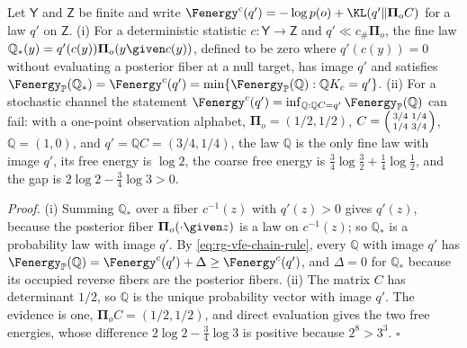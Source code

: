 \label{eq:rg-thermo-finite-unwarranted-infimum}
\label{eq:rg-thermo-finite-stochastic-infimum-witness}
Let $\mathsf Y$ and $\mathsf Z$ be finite and write
$\Fenergy^c(q')=-\log p(o)+\KL(q'\Vert\boldsymbol\Pi_oC)$ for a law $q'$ on $\mathsf Z$. (i) For a
deterministic statistic $c:\mathsf Y\to\mathsf Z$ and $q'\ll c_\#\boldsymbol\Pi_o$, the fine law
$\mathbb Q_*(y)=q'(c(y))\boldsymbol\Pi_o(y\given c(y))$, defined to be zero where $q'(c(y))=0$
without evaluating a posterior fiber at a null target, has image $q'$ and satisfies
$\Fenergy_{\mathbb P}(\mathbb Q_*)=\Fenergy^c(q')=\min\{\Fenergy_{\mathbb P}(\mathbb Q):
\mathbb QK_c=q'\}$. (ii) For a stochastic channel the statement
$\Fenergy^c(q')=\inf_{\mathbb Q:\mathbb QC=q'}\Fenergy_{\mathbb P}(\mathbb Q)$ can fail: with a
one-point observation alphabet, $\boldsymbol\Pi_o=(1/2,1/2)$,
$C=\begin{psmallmatrix}3/4&1/4\\1/4&3/4\end{psmallmatrix}$, $\mathbb Q=(1,0)$, and
$q'=\mathbb QC=(3/4,1/4)$, the law $\mathbb Q$ is the only fine law with image $q'$, its free
energy is $\log2$, the coarse free energy is $\tfrac34\log\tfrac32+\tfrac14\log\tfrac12$, and the gap
is $2\log2-\tfrac34\log3>0$. 

\noindent\emph{Proof.}
(i) Summing $\mathbb Q_*$ over a fiber $c^{-1}(z)$ with $q'(z)>0$ gives $q'(z)$, because the
posterior fiber $\boldsymbol\Pi_o(\cdot\given z)$ is a law on $c^{-1}(z)$; so $\mathbb Q_*$ is a
probability law with image $q'$. By \eqref{eq:rg-vfe-chain-rule}, every $\mathbb Q$ with image $q'$
has $\Fenergy_{\mathbb P}(\mathbb Q)=\Fenergy^c(q')+\Delta\geq\Fenergy^c(q')$, and $\Delta=0$ for
$\mathbb Q_*$ because its occupied reverse fibers are the posterior fibers. (ii) The matrix $C$ has
determinant $1/2$, so $\mathbb Q$ is the unique probability vector with image $q'$. The evidence is
one, $\boldsymbol\Pi_oC=(1/2,1/2)$, and direct evaluation gives the two free energies, whose
difference $2\log2-\tfrac34\log3$ is positive because $2^8>3^3$. $\square$


